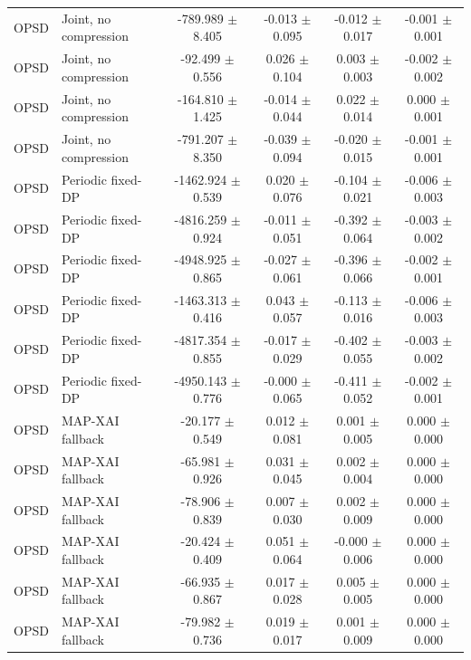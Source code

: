 \begin{table}[t]
\begin{tabular}{llcccc}
OPSD & Joint, no compression & -789.989 $\pm$ 8.405 & -0.013 $\pm$ 0.095 & -0.012 $\pm$ 0.017 & -0.001 $\pm$ 0.001 \\
OPSD & Joint, no compression & -92.499 $\pm$ 0.556 & 0.026 $\pm$ 0.104 & 0.003 $\pm$ 0.003 & -0.002 $\pm$ 0.002 \\
OPSD & Joint, no compression & -164.810 $\pm$ 1.425 & -0.014 $\pm$ 0.044 & 0.022 $\pm$ 0.014 & 0.000 $\pm$ 0.001 \\
OPSD & Joint, no compression & -791.207 $\pm$ 8.350 & -0.039 $\pm$ 0.094 & -0.020 $\pm$ 0.015 & -0.001 $\pm$ 0.001 \\
OPSD & Periodic fixed-DP & -1462.924 $\pm$ 0.539 & 0.020 $\pm$ 0.076 & -0.104 $\pm$ 0.021 & -0.006 $\pm$ 0.003 \\
OPSD & Periodic fixed-DP & -4816.259 $\pm$ 0.924 & -0.011 $\pm$ 0.051 & -0.392 $\pm$ 0.064 & -0.003 $\pm$ 0.002 \\
OPSD & Periodic fixed-DP & -4948.925 $\pm$ 0.865 & -0.027 $\pm$ 0.061 & -0.396 $\pm$ 0.066 & -0.002 $\pm$ 0.001 \\
OPSD & Periodic fixed-DP & -1463.313 $\pm$ 0.416 & 0.043 $\pm$ 0.057 & -0.113 $\pm$ 0.016 & -0.006 $\pm$ 0.003 \\
OPSD & Periodic fixed-DP & -4817.354 $\pm$ 0.855 & -0.017 $\pm$ 0.029 & -0.402 $\pm$ 0.055 & -0.003 $\pm$ 0.002 \\
OPSD & Periodic fixed-DP & -4950.143 $\pm$ 0.776 & -0.000 $\pm$ 0.065 & -0.411 $\pm$ 0.052 & -0.002 $\pm$ 0.001 \\
OPSD & MAP-XAI fallback & -20.177 $\pm$ 0.549 & 0.012 $\pm$ 0.081 & 0.001 $\pm$ 0.005 & 0.000 $\pm$ 0.000 \\
OPSD & MAP-XAI fallback & -65.981 $\pm$ 0.926 & 0.031 $\pm$ 0.045 & 0.002 $\pm$ 0.004 & 0.000 $\pm$ 0.000 \\
OPSD & MAP-XAI fallback & -78.906 $\pm$ 0.839 & 0.007 $\pm$ 0.030 & 0.002 $\pm$ 0.009 & 0.000 $\pm$ 0.000 \\
OPSD & MAP-XAI fallback & -20.424 $\pm$ 0.409 & 0.051 $\pm$ 0.064 & -0.000 $\pm$ 0.006 & 0.000 $\pm$ 0.000 \\
OPSD & MAP-XAI fallback & -66.935 $\pm$ 0.867 & 0.017 $\pm$ 0.028 & 0.005 $\pm$ 0.005 & 0.000 $\pm$ 0.000 \\
OPSD & MAP-XAI fallback & -79.982 $\pm$ 0.736 & 0.019 $\pm$ 0.017 & 0.001 $\pm$ 0.009 & 0.000 $\pm$ 0.000 \\
\bottomrule
\end{tabular}
\end{table}
